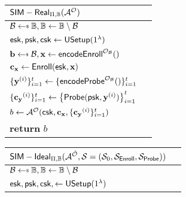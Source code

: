 \begin{figure}[h]
	\begin{center}

		\begin{subfigure}[t]{0.49\textwidth}
		\begin{tabular}{l c}
			${\sf SIM-Real}_{\Pi, \mathbb{B}}(\mathcal{A}^\mathcal{O})$\\

			\hline

			$\mathcal{B} \getsdollar \mathbb{B}, \mathbb{B} \gets \mathbb{B} \setminus \mathcal{B}$ \\

			${\sf esk}, {\sf psk}, {\sf csk} \gets {\sf USetup}(1^\lambda)$ \\

			$ \mathbf{b} \getsdollar \mathcal{B}, \mathbf{x} \gets {\sf encodeEnroll}^{\mathcal{O}_{\mathcal{B}}}()$ \\

			$\mathbf{c_x} \gets {\sf Enroll}({\sf esk}, \mathbf{x})$ \\

			$\{\mathbf{y}^{(i)}\}_{i=1}^t \gets \{{\sf encodeProbe}^{\mathcal{O}_{\mathcal{B}}}() \}_{i=1}^t $ \\
			
			$\{ \mathbf{c_y}^{(i)} \}_{i=1}^t \gets \left\{ {\sf Probe}( {\sf psk}, \mathbf{y}^{(i)} ) \right \}_{i=1}^t$ \\

			$b \gets \mathcal{A}^{\mathcal{O}} ({\sf csk}, \mathbf{c_x}, \{\mathbf{c_y}^{(i)}\}_{i=1}^t )$ \\

			\textbf{return} $b$
			
		\end{tabular}
		\end{subfigure}
		\begin{subfigure}[t]{0.49\textwidth}
		\begin{tabular}{l c}
			${\sf SIM-Ideal}_{\Pi, \mathbb{B}}(\mathcal{A}^{\tilde{\mathcal{O}}}, \mathcal{S} = (\mathcal{S}_0, \mathcal{S}_{\sf Enroll}, \mathcal{S}_{\sf Probe}))$\\

			\hline

			$\mathcal{B} \getsdollar \mathbb{B}, \mathbb{B} \gets \mathbb{B} \setminus \mathcal{B}$ \\

			${\sf esk}, {\sf psk}, {\sf csk}, \gets {\sf USetup}(1^\lambda)$ \\


\end{tabular}
\end{subfigure}
\end{center}
\end{figure}
